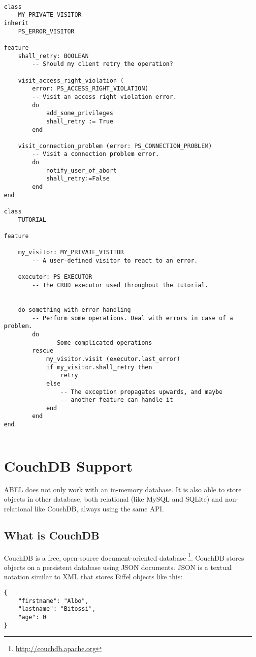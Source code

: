 \documentclass[a4paper,12pt]{report}
\begin{document}
\begin{lstlisting}[language=OOSC2Eiffel, captionpos=b, caption={Sample error handling using a visitor.}, label={lst:error_visitor_example}]

class
	MY_PRIVATE_VISITOR
inherit
	PS_ERROR_VISITOR

feature
	shall_retry: BOOLEAN
		-- Should my client retry the operation?

	visit_access_right_violation (
		error: PS_ACCESS_RIGHT_VIOLATION)
		-- Visit an access right violation error.
		do
			add_some_privileges
			shall_retry := True
		end

	visit_connection_problem (error: PS_CONNECTION_PROBLEM)
		-- Visit a connection problem error.
		do
			notify_user_of_abort
			shall_retry:=False
		end
end

class
	TUTORIAL

feature

	my_visitor: MY_PRIVATE_VISITOR
		-- A user-defined visitor to react to an error.

	executor: PS_EXECUTOR
		-- The CRUD executor used throughout the tutorial.


	do_something_with_error_handling
		-- Perform some operations. Deal with errors in case of a problem.
		do
			-- Some complicated operations
		rescue
			my_visitor.visit (executor.last_error)
			if my_visitor.shall_retry then
				retry
			else
				-- The exception propagates upwards, and maybe
				-- another feature can handle it
			end
		end
end


\end{lstlisting}


\chapter{CouchDB Support}

ABEL does not only work with an in-memory database. It is also able to store objects in other database, both relational (like MySQL and SQLite) and non-relational like CouchDB, always using the same API.

\section{What is CouchDB}

CouchDB is a free, open-source document-oriented database \footnote{\url{http://couchdb.apache.org}}. CouchDB stores objects on a persistent database using JSON documents.
JSON is a textual notation similar to XML that stores Eiffel objects like this:
\begin{lstlisting}[language=OOSC2Eiffel, captionpos=b, caption={Sample Eiffel Object in JSON}, label={lst:person_json}]
{
	"firstname": "Albo",
	"lastname": "Bitossi",
	"age": 0
}
\end{lstlisting}
\end{document}
